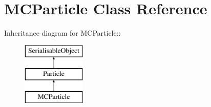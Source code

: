 \hypertarget{classMCParticle}{
\section{MCParticle Class Reference}
\label{classMCParticle}
}
Inheritance diagram for MCParticle::\begin{figure}[H]
\begin{center}
\leavevmode
\includegraphics[height=3cm]{classMCParticle}
\end{center}
\end{figure}
